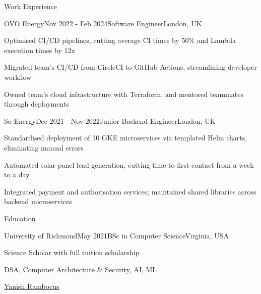 \documentclass{resume} %
\begin{document}
\begin{rSection}{Work Experience}
\begin{rSubsection}{OVO Energy}{Nov 2022 - Feb 2024}{Software Engineer}{London, UK}
    \item Optimised CI/CD pipelines, cutting average CI times by 50\% and Lambda execution times by 12x
    \item Migrated team's CI/CD from CircleCI to GitHub Actions, streamlining developer workflow
    \item Owned team's cloud infrastructure with Terraform, and mentored teammates through deployments
  \end{rSubsection}
  \begin{rSubsection}{So Energy}{Dec 2021 - Nov 2022}{Junior Backend Engineer}{London, UK}
    \item Standardised deployment of 10 GKE microservices via templated Helm charts, eliminating manual errors
    \item Automated solar-panel lead generation, cutting time-to-first-contact from a week to a day
    \item Integrated payment and authorisation services; maintained shared libraries across backend microservices
  \end{rSubsection}

\end{rSection}

\newpage

\begin{rSection}{Education}
    \capsdef{////}{\scshape}{0.1pt}{2.5pt}{1pt}
    \begin{rSubsection}{University of Richmond}{May 2021}{BSc in Computer Science}{Virginia, USA}
    \item[] Science Scholar with full tuition scholarship
    \item[]  DSA, Computer Architecture \& Security, AI, ML
    \end{rSubsection}

\end{rSection}

\vspace{1.4em}

\small
\noindent
\faLinkedin \hspace{0.2em} \href{https://linkedin.com/in/yanish-rambocus-4a46b7155/}{\underline{Yanish Rambocus}}
\hspace{150pt}
\end{document}
